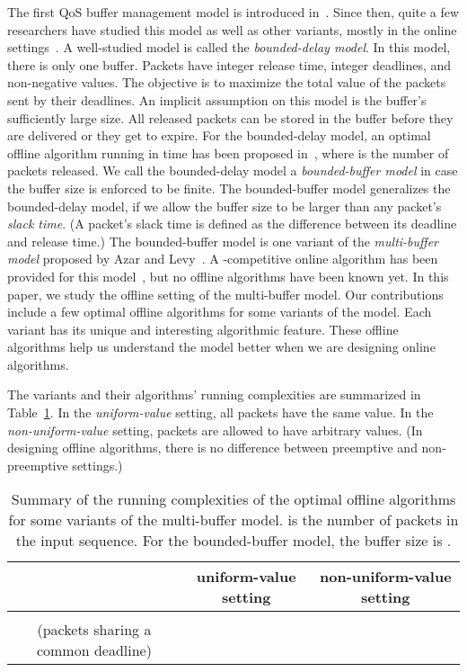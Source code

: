 \documentclass[final, 11pt]{article}
\begin{document}
The first QoS buffer management model is introduced in~\cite{AMRR05}. Since then, quite a few researchers have studied this model as well as other variants, mostly in the online settings~\cite{KLMPSS04, H01, CJST07, LSS05, EW07}. A well-studied model is called the {\em bounded-delay model}. In this model, there is only one buffer. Packets have integer release time, integer deadlines, and non-negative values. The objective is to maximize the total value of the packets sent by their deadlines. An implicit assumption on this model is the buffer's sufficiently large size. All released packets can be stored in the buffer before they are delivered or they get to expire. For the bounded-delay model, an optimal offline algorithm running in  time has been proposed in~\cite{KLMPSS04}, where  is the number of packets released. We call the bounded-delay model a {\em bounded-buffer model} in case the buffer size is enforced to be finite. The bounded-buffer model generalizes the bounded-delay model, if we allow the buffer size to be larger than any packet's {\em slack time}. (A packet's slack time is defined as the difference between its deadline and release time.) The bounded-buffer model is one variant of the {\em multi-buffer model} proposed by Azar and Levy~\cite{AL06}. A -competitive online algorithm has been provided for this model~\cite{AL06}, but no offline algorithms have been known yet. In this paper, we study the offline setting of the multi-buffer model. Our contributions include a few optimal offline algorithms for some variants of the model. Each variant has its unique and interesting algorithmic feature. These offline algorithms help us understand the model better when we are designing online algorithms.

The variants and their algorithms' running complexities are summarized in Table~\ref{tbl:summary}. In the {\em uniform-value} setting, all packets have the same value. In the {\em non-uniform-value} setting, packets are allowed to have arbitrary values. (In designing offline algorithms, there is no difference between preemptive and non-preemptive settings.)

\begin{table}[h]
\begin{tabular}{|c|c|c|}
\hline \hline
& uniform-value setting & non-uniform-value setting \\ \hline
 &  &  \\ \hline
 (packets sharing a common deadline) &  &  \\ \hline \hline
\end{tabular}
\label{tbl:summary}
\caption{Summary of the running complexities of the optimal offline algorithms for some variants of the multi-buffer model.  is the number of packets in the input sequence. For the bounded-buffer model, the buffer size is .}
\end{table}
\end{document}
